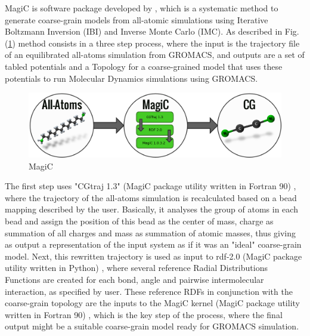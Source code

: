\documentclass[10pt,a4paper,twoside]{article}
\begin{document}
MagiC is software package developed by , which is a systematic method to generate coarse-grain models from all-atomic simulations using Iterative Boltzmann Inversion (IBI) and Inverse Monte Carlo (IMC). As described in Fig.(\ref{Fig:magic}) method consists in a three step process, where the input is the trajectory file of an equilibrated all-atoms simulation from GROMACS, and outputs are a set of tabled potentials and a Topology for a coarse-grained model that uses these potentials to run Molecular Dynamics simulations using GROMACS. 
 \begin{figure}[ht]
  \begin{center}
	\includegraphics[width=1 \textwidth]{./images/magic}
	\caption{MagiC}
	\label{Fig:magic}
	\end{center}
	\end{figure}

 The first step uses "CGtraj 1.3" (MagiC package utility written in Fortran 90) \cite{magicmanu}, where the trajectory of the all-atoms simulation is recalculated based on a bead mapping described by the user. Basically, it analyses the group of atoms in each bead and assign the position of this bead as the center of mass, charge as summation of all charges and mass as summation of atomic masses, thus giving as output a representation of the input system as if it was an "ideal" coarse-grain model. Next, this rewritten trajectory is used as input to rdf-2.0  (MagiC package utility written in Python) \cite{magicmanu}, where several reference Radial Distributions Functions are created for each bond, angle and pairwise intermolecular interaction, as specified by user. These reference RDFs in conjunction with the coarse-grain topology are the  inputs to the MagiC kernel (MagiC package utility written in Fortran 90) \cite{magicmanu}, which is the key step of the process, where the final output might be a suitable coarse-grain model ready for GROMACS simulation.
 
\end{document}
